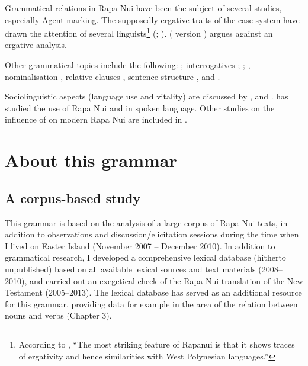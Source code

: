 Grammatical relations in Rapa Nui have been the subject of several studies, especially Agent marking. The supposedly ergative traits of the case system have drawn the attention of several linguists\footnote{\label{fn:26}According to \citet[182]{Mosel1997}, “The most striking feature of Rapanui is that it shows traces of ergativity and hence similarities with West Polynesian languages.”} (\citealt{Alexander1981OL,Alexander1981Minnesota,Alexander1982,FinneyAlexander1998}; \citealt{Finney2000,Finney2001}). \citet{WeberR1988} ( version \citealt{WeberR2003}) argues against an ergative analysis.

Other grammatical topics include the following:  \citep{DuFeu1994}; interrogatives \citep{DuFeu1995};  \citep{MulloyRapu1977};  \citep{Johnston1978}, nominalisation \citep{McAdams1980}, relative clauses \citep{Silva-Corvalán1978}, sentence structure \citep{Smith1980}, and  \citep{Stenson1981}.

Sociolinguistic aspects (language use and vitality) are discussed by \citet{WeberWeber1984,WeberWeber1990Sobrevivir,WeberWeber1998}, \citet{GómezMacker1977,GómezMacker1979} and \citet{HaoaCardinali2012}. \citet{Makihara1998,Makihara1999,Makihara2001Changing,Makihara2001Adaptation,Makihara2004,Makihara2007,Makihara2009} has studied the use of Rapa Nui and  in spoken language. Other studies on the influence of  on modern Rapa Nui are included in \citet{StolzBakker2008}. 

\section{About this grammar}\label{sec:1.6}
\subsection{A corpus-based study}\label{sec:1.6.1}

This grammar is based on the analysis of a large corpus of Rapa Nui texts, in addition to observations and discussion/elicitation sessions during the time when I lived on Easter Island (November 2007 – December 2010). In addition to grammatical research, I developed a comprehensive lexical database (hitherto unpublished) based on all available lexical sources and text materials (2008–2010), and carried out an exegetical check of the Rapa Nui translation of the New Testament (2005–2013). The lexical database has served as an additional resource for this grammar, providing data for example in the area of the relation between nouns and verbs (Chapter 3).

